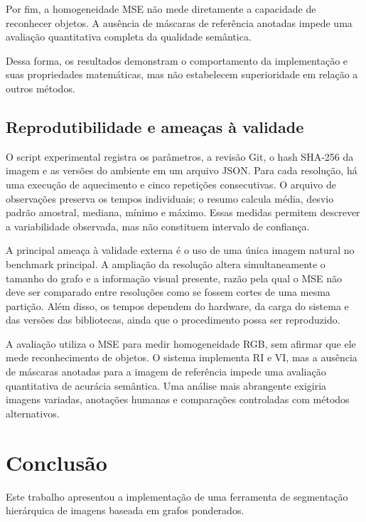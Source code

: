 \documentclass[12pt]{article}
\begin{document}
Por fim, a homogeneidade MSE não mede
diretamente a capacidade de reconhecer
objetos. A ausência de máscaras de
referência anotadas impede uma
avaliação quantitativa completa
da qualidade semântica.

Dessa forma, os resultados demonstram
o comportamento da implementação
e suas propriedades matemáticas,
mas não estabelecem superioridade
em relação a outros métodos.

\subsection{Reprodutibilidade e ameaças à validade}

O script experimental registra os parâmetros, a revisão Git,
o hash SHA-256 da imagem e as versões do ambiente em um arquivo
JSON. Para cada resolução, há uma execução de aquecimento e cinco
repetições consecutivas. O arquivo de observações preserva os
tempos individuais; o resumo calcula média, desvio padrão amostral,
mediana, mínimo e máximo. Essas medidas permitem descrever a
variabilidade observada, mas não constituem intervalo de confiança.

A principal ameaça à validade externa é o uso de uma única imagem
natural no benchmark principal. A ampliação da resolução altera
simultaneamente o tamanho do grafo e a informação visual presente,
razão pela qual o MSE não deve ser comparado entre resoluções como
se fossem cortes de uma mesma partição. Além disso, os tempos
dependem do hardware, da carga do sistema e das versões das
bibliotecas, ainda que o procedimento possa ser reproduzido.

A avaliação utiliza o MSE para medir homogeneidade RGB, sem afirmar
que ele mede reconhecimento de objetos. O sistema implementa RI e VI,
mas a ausência de máscaras anotadas para a imagem de referência
impede uma avaliação quantitativa de acurácia semântica. Uma análise
mais abrangente exigiria imagens variadas, anotações humanas e
comparações controladas com métodos alternativos.

\section{Conclusão}
\label{sec:conclusao}

Este trabalho apresentou a implementação
de uma ferramenta de segmentação hierárquica
de imagens baseada em grafos ponderados.
\end{document}

